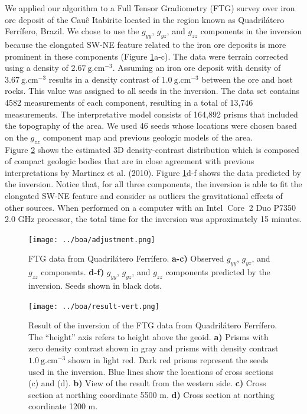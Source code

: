 \documentclass{segabs}
\begin{document}
We applied our algorithm to a Full Tensor Gradiometry (FTG) survey over iron ore deposit
of the Cau\^e Itabirite located in the region known as Quadril\'atero Ferr\'ifero, Brazil.
We chose to use the $g_{yy}$, $g_{yz}$, and $g_{zz}$ components in the inversion because the
elongated SW-NE feature related to the iron ore deposits is more prominent in these components
(Figure \ref{fig:boa-data}a-c).
The data were terrain corrected using a density of $2.67\ \text{g.cm}^{-3}$.
Assuming an iron ore deposit with density of $3.67\ \text{g.cm}^{-3}$ results in a
density contrast of $1.0\ \text{g.cm}^{-3}$ between the ore and host rocks.
This value was assigned to all seeds in the inversion.
The data set contains 4582 measurements of each component, resulting in a total of 13,746
measurements.
The interpretative model consists of 164,892 prisms that included the topography of the area.
We used 46 seeds whose locations were chosen based on the $g_{zz}$ component
map and previous geologic models of the area.
\\[0.2cm]
Figure \ref{fig:boa-res} shows the estimated 3D density-contrast distribution which is
composed of compact geologic bodies that are in close agreement with previous interpretations by
Martinez et al. (2010).
Figure \ref{fig:boa-data}d-f shows the data predicted by the inversion.
Notice that, for all three components, the inversion is able to fit the elongated SW-NE feature 
and consider as outliers the gravitational effects of other sources.
When performed on a computer with an Intel\textregistered$\ $ Core\texttrademark$\ $ 2
Duo P7350 2.0 GHz processor, the total time for the inversion was approximately 15 minutes.

\begin{figure}[htb]
        \texttt{[image: ../boa/adjustment.png]}
    \caption{FTG data from Quadril\'atero Ferr\'ifero.
    \textbf{a-c)} Observed $g_{yy}$, $g_{yz}$, and $g_{zz}$ components.
    \textbf{d-f)} $g_{yy}$, $g_{yz}$, and $g_{zz}$ components predicted by the inversion.
    Seeds shown in black dots.
    \label{fig:boa-data}}
\end{figure}
\begin{figure}[htb]
        \texttt{[image: ../boa/result-vert.png]}
    \caption{Result of the inversion of the FTG data from Quadril\'atero Ferr\'ifero.
    The ``height'' axis refers to height above the geoid. 
    \textbf{a)} Prisms with zero density contrast shown in gray and prisms with density contrast
    $1.0\ \text{g.cm}^{-3}$ shown in light red. Dark red prisms represent the seeds used in the
    inversion. Blue lines show the locations of cross sections (c) and (d).
    \textbf{b)} View of the result from the western side.
    \textbf{c)} Cross section at northing coordinate 5500 m.
    \textbf{d)} Cross section at northing coordinate 1200 m.
    \label{fig:boa-res}}
\end{figure}
\end{document}
